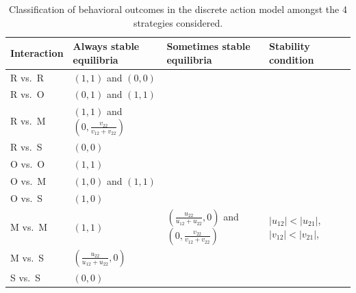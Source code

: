 \documentclass[11pt,reqno]{amsart}
\begin{document}
\begin{table}[]
\small
\caption{Classification of behavioral outcomes in the discrete action model amongst the 4 strategies considered.}
\label{behOut}
\begin{tabular}{@{}llll@{}}
\toprule
    \textbf{Interaction}    & \textbf{Always stable equilibria}                       & \textbf{Sometimes stable equilibria}                                               & \textbf{Stability condition}                           \\ \midrule
R vs.~R & $(1,1)$ and $(0,0)$                                               &                                                                           &                                               \\ \midrule
R vs.~O & $(0,1)$ and $(1,1)$                            &                                                                           &                                               \\ \midrule
R vs.~M & $(1,1)$ and $(0,\frac{v_{22}}{v_{12}+v_{22}})$ &                                                                           &                                               \\ \midrule
R vs.~S & $(0,0)$                                        &                                                                           &                                               \\ \midrule
O vs.~O & $(1,1)$                                        &                                                                           &                                               \\ \midrule
O vs.~M & $(1,0)$ and $(1,1)$                            &                                                                           &                                               \\ \midrule
O vs.~S & $(1,0)$                                        &                                                                           &                                               \\ \midrule
M vs.~M & $(1,1)$                                        & $(\frac{u_{22}}{u_{12}+u_{22}},0)$ and $(0,\frac{v_{22}}{v_{12}+v_{22}})$ & $|u_{12}| < |u_{21}|$, $|v_{12}| < |v_{21}|$, \\ \midrule
M vs.~S & $(\frac{u_{22}}{u_{12}+u_{22}},0)$             &                                                                           &                                               \\ \midrule
S vs.~S & $(0,0)$                                        &                                                                           &                                               \\ \bottomrule
\end{tabular}
\end{table}
\end{document}
